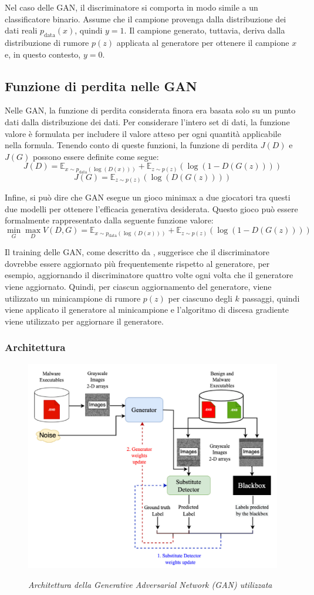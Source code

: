 Nel caso delle GAN, il discriminatore si comporta in modo simile a un classificatore binario. Assume che il campione provenga dalla distribuzione dei dati reali \( p_{\text{data}}(x) \), quindi \( y = 1 \). Il campione generato, tuttavia, deriva dalla distribuzione di rumore \( p(z) \) applicata al generatore per ottenere il campione \( x \) e, in questo contesto, \( y = 0 \).

\subsection{Funzione di perdita nelle GAN}
Nelle GAN, la funzione di perdita considerata finora era basata solo su un punto dati dalla distribuzione dei dati. Per considerare l'intero set di dati, la funzione valore è formulata per includere il valore atteso per ogni quantità applicabile nella formula. Tenendo conto di queste funzioni, la funzione di perdita \( J(D) \) e \( J(G) \) possono essere definite come segue:
\[
J(D) = \mathbb{E}_{x \sim p_{\text{data}}(\log(D(x)))} + \mathbb{E}_{z \sim p(z)}(\log(1 - D(G(z))))
\]
\[
J(G) = \mathbb{E}_{z \sim p(z)}(\log(D(G(z))))
\]

Infine, si può dire che GAN esegue un gioco minimax a due giocatori tra questi due modelli per ottenere l'efficacia generativa desiderata. Questo gioco può essere formalmente rappresentato dalla seguente funzione valore:
\[
\min_{G} \max_{D} V(D, G) = \mathbb{E}_{x \sim p_{\text{data}}(\log(D(x)))} + \mathbb{E}_{z \sim p(z)}(\log(1 - D(G(z))))
\]

Il training delle GAN, come descritto da , suggerisce che il discriminatore dovrebbe essere aggiornato più frequentemente rispetto al generatore, per esempio, aggiornando il discriminatore quattro volte ogni volta che il generatore viene aggiornato.
Quindi, per ciascun aggiornamento del generatore, viene utilizzato un minicampione di rumore \( p(z) \) per ciascuno degli \( k \) passaggi, quindi viene applicato il generatore al minicampione e l'algoritmo di discesa gradiente viene utilizzato per aggiornare il generatore.


\subsubsection{Architettura}
\begin{figure}[ht]
    \centering
        \centering
        \includegraphics[width=0.6\linewidth]{images/GAN_architecture.png}
        \label{fig:gan_architecture}
        \caption{\emph{Architettura della Generative Adversarial Network (GAN) utilizzata}}
\end{figure}
\newpage
